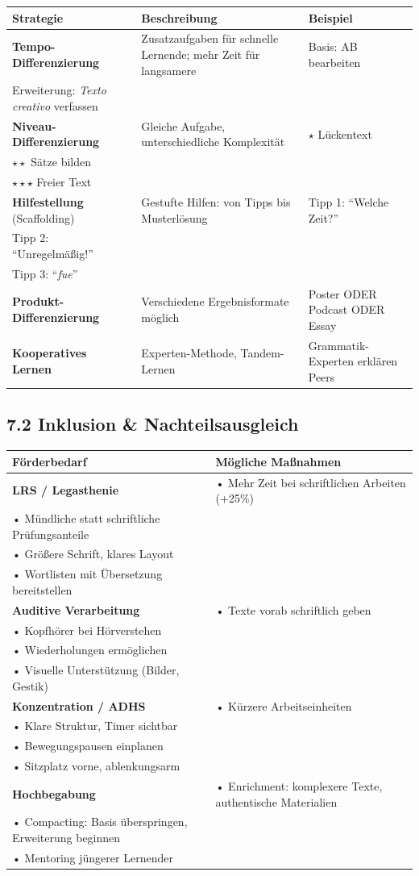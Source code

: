 \documentclass[11pt, a4paper]{article}
\newcommand{\es}[1]{\textit{#1}}
\begin{document}
\begin{tabularx}{\textwidth}{|L{3cm}|X|X|}
\hline
{}
\textbf{Strategie} & \textbf{Beschreibung} & \textbf{Beispiel} \\
\hline
\textbf{Tempo-Differenzierung} &
Zusatzaufgaben für schnelle Lernende; mehr Zeit für langsamere &
Basis: AB bearbeiten\\Erweiterung: \es{Texto creativo} verfassen \\
\hline
\textbf{Niveau-Differenzierung} &
Gleiche Aufgabe, unterschiedliche Komplexität &
$\star$ Lückentext\\$\star\star$ Sätze bilden\\$\star\star\star$ Freier Text \\
\hline
\textbf{Hilfestellung} (Scaffolding) &
Gestufte Hilfen: von Tipps bis Musterlösung &
Tipp 1: ``Welche Zeit?''\\Tipp 2: ``Unregelmäßig!''\\Tipp 3: ``\es{fue}'' \\
\hline
\textbf{Produkt-Differenzierung} &
Verschiedene Ergebnisformate möglich &
Poster ODER Podcast ODER Essay \\
\hline
\textbf{Kooperatives Lernen} &
Experten-Methode, Tandem-Lernen &
Grammatik-Experten erklären Peers \\
\hline
\end{tabularx}

\subsection*{7.2 Inklusion \& Nachteilsausgleich}

\begin{tabularx}{\textwidth}{|L{3cm}|X|}
\hline
{}
\textbf{Förderbedarf} & \textbf{Mögliche Maßnahmen} \\
\hline
\textbf{LRS / Legasthenie} &
• Mehr Zeit bei schriftlichen Arbeiten (+25\%)\\
• Mündliche statt schriftliche Prüfungsanteile\\
• Größere Schrift, klares Layout\\
• Wortlisten mit Übersetzung bereitstellen \\
\hline
\textbf{Auditive Verarbeitung} &
• Texte vorab schriftlich geben\\
• Kopfhörer bei Hörverstehen\\
• Wiederholungen ermöglichen\\
• Visuelle Unterstützung (Bilder, Gestik) \\
\hline
\textbf{Konzentration / ADHS} &
• Kürzere Arbeitseinheiten\\
• Klare Struktur, Timer sichtbar\\
• Bewegungspausen einplanen\\
• Sitzplatz vorne, ablenkungsarm \\
\hline
\textbf{Hochbegabung} &
• Enrichment: komplexere Texte, authentische Materialien\\
• Compacting: Basis überspringen, Erweiterung beginnen\\
• Mentoring jüngerer Lernender \\
\hline
\end{tabularx}
\end{document}
